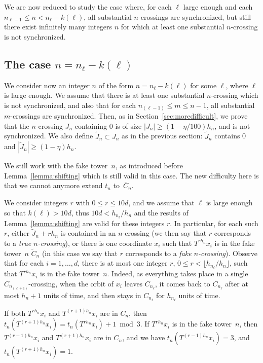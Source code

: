 \documentclass[10pt]{amsart}
\theoremstyle{definition}\newtheorem{defi}[theo]{Definition}\newtheorem{rema}[theo]{Remark}\newtheorem{exam}[theo]{Example}\newtheorem{exem}[theo]{Example}\newtheorem{nota}[theo]{Notation}
\begin{document}
We are now reduced to study the case where, for each $\ell$ large enough and each $n_{\ell-1}\le n < n_\ell-k(\ell)$, all substantial $n$-crossings are synchronized, but still there exist infinitely many integers $n$ for which at least one substantial $n$-crossing is not synchronized.



\subsection{The case \texorpdfstring{$n = n_\ell-k(\ell)$}{n = nl-k(l)}}\label{sec:thirdcase}

We consider now an integer $n$ of the form $n=n_\ell-k(\ell)$ for some $\ell$, where $\ell$ is large enough. We assume that there is at least one substantial $n$-crossing which is not synchronized, and also that for each $n_{(\ell-1)}\le m\le n-1$, all substantial $m$-crossings are synchronized. Then, as in Section~\ref{sec:moredifficult}, we prove that the $n$-crossing $J_n$ containing 0 is of size $|J_n|\ge (1-\eta/100)h_n$, and is not synchronized. We also define $\tilde J_n\subset J_n$ as in the previous section: $\tilde J_n$ contains 0 and $|\tilde J_n|\ge (1-\eta)h_n$.

We still work with the fake tower~$n$, as introduced before Lemma~\ref{lemma:shifting} which is still valid in this case. The new difficulty here is that we cannot anymore extend $t_n$ to~$\overline{C}_n$.

We consider integers $r$ with $0\le r\le 10d$, and we assume that $\ell$ is large enough so that $k(\ell)>10d$, thus $10d< h_{n_\ell}/h_n$ and the results of Lemma~\ref{lemma:shifting} are valid for these integers $r$. In particular, for each such $r$, either $\tilde J_n+rh_n$ is contained in an $n$-crossing (we then say that $r$ corresponds to a \emph{true $n$-crossing}), or there is one coordinate $x_i$ such that $T^{rh_n}x_i$ is in the fake tower~$n$ $\tilde C_n$ (in this case we say that $r$ corresponds to a \emph{fake $n$-crossing}). Observe that for each $i=1,\ldots,d$, there is at most one integer $r$, $0\le r < \lfloor h_{n_\ell}/h_n\rfloor$, such that $T^{rh_n}x_i$ is in the fake tower~$n$. Indeed, as everything takes place in a single $C_{n_{(\ell+1)}}$-crossing, when the orbit of $x_i$ leaves $C_{n_\ell}$, it comes back to $C_{n_\ell}$ after at most $h_n+1$ units of time, and then stays in $C_{n_\ell}$ for $h_{n_\ell}$ units of time.

If both $T^{rh_n}x_i$ and $T^{(r+1)h_n}x_i$ are in $C_n$, then $t_n(T^{(r+1)h_n}x_i)=t_n(T^{rh_n}x_i)+1 \bmod 3$. If $T^{rh_n}x_i$ is in the fake tower~$n$, then $T^{(r-1)h_n}x_i$ and $T^{(r+1)h_n}x_i$ are in $C_n$, and we have $t_n(T^{(r-1)h_n}x_i)=3$, and $t_n(T^{(r+1)h_n}x_i)=1$.
\end{document}
